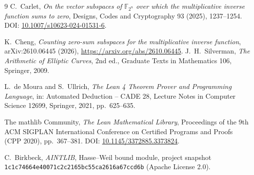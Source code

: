 \documentclass[11pt]{amsart}
\numberwithin{equation}{section}
\theoremstyle{definition}
\theoremstyle{remark}
\begin{document}
\begin{thebibliography}{9}
C.~Carlet, \emph{On the vector subspaces of $\mathbb F_{2^n}$ over which the multiplicative inverse function sums to zero}, Designs, Codes and Cryptography 93 (2025), 1237--1254. DOI: \href{https://doi.org/10.1007/s10623-024-01531-6}{10.1007/s10623-024-01531-6}.

K.~Cheng, \emph{Counting zero-sum subspaces for the multiplicative inverse function}, arXiv:2610.06445 (2026), \url{https://arxiv.org/abs/2610.06445}.
J.~H.~Silverman, \emph{The Arithmetic of Elliptic Curves}, 2nd ed., Graduate Texts in Mathematics 106, Springer, 2009.

L.~de Moura and S.~Ullrich, \emph{The Lean 4 Theorem Prover and Programming Language}, in: Automated Deduction -- CADE 28, Lecture Notes in Computer Science 12699, Springer, 2021, pp.~625--635.

The mathlib Community, \emph{The Lean Mathematical Library}, Proceedings of the 9th ACM SIGPLAN International Conference on Certified Programs and Proofs (CPP 2020), pp.~367--381. DOI: \href{https://doi.org/10.1145/3372885.3373824}{10.1145/3372885.3373824}.

C.~Birkbeck, \emph{AINTLIB}, Hasse--Weil bound module, project snapshot \texttt{1c1c7466\allowbreak 4e40071c\allowbreak 2c2165bc\allowbreak 55ca2616\allowbreak a67ccd6b} (Apache License 2.0).
\end{thebibliography}
\end{document}
